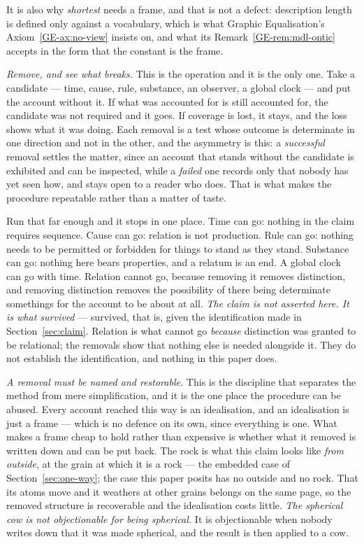 \documentclass[11pt,a4paper]{article}
\begin{document}
It is also why \emph{shortest} needs a frame, and that is not a defect: description length is defined
only against a vocabulary, which is what Graphic Equalisation's Axiom~\ref{GE-ax:no-view} insists on,
and what its Remark~\ref{GE-rem:mdl-ontic} accepts in the form that the constant is the frame.

\emph{Remove, and see what breaks.} This is the operation and it is the only one. Take a candidate ---
time, cause, rule, substance, an observer, a global clock --- and put the account without it. If what
was accounted for is still accounted for, the candidate was not required and it goes. If coverage is
lost, it stays, and the loss shows what it was doing. Each removal is a test whose outcome is determinate in one
direction and not in the other, and the asymmetry is this: a
\emph{successful} removal settles the matter, since an account that stands without the candidate is
exhibited and can be inspected, while a \emph{failed} one records only that nobody has yet seen how,
and stays open to a reader who does. That is what makes the procedure repeatable rather than a matter
of taste.

Run that far enough and it stops in one place. Time can go: nothing in the claim requires sequence.
Cause can go: relation is not production. Rule can go: nothing needs to be permitted or forbidden for
things to stand as they stand. Substance can go: nothing here bears properties, and a relatum is an
end. A global clock can go with time. Relation cannot go, because removing it removes distinction, and removing
distinction removes the possibility of there being determinate somethings for the account to be about at
all. \emph{The claim is not asserted here. It is what survived} --- survived, that is, given the
identification made in Section~\ref{sec:claim}. Relation is what cannot go \emph{because} distinction
was granted to be relational; the removals show that nothing else is needed alongside it. They do not
establish the identification, and nothing in this paper does.

\emph{A removal must be named and restorable.} This is the discipline that separates the method from
mere simplification, and it is the one place the procedure can be abused. Every account reached this way
is an idealisation, and an idealisation is just a frame --- which is no defence on its own, since
everything is one. What makes a frame cheap to hold rather than expensive is whether what it removed is
written down and can be put back. The rock is what this claim looks like \emph{from outside}, at the grain at which it is a
rock --- the embedded case of Section~\ref{sec:one-way}; the case this paper posits has no outside and
no rock. That its atoms move and it weathers at other grains belongs on the same page, so the removed
structure is recoverable and the idealisation costs little. \emph{The spherical cow is not objectionable
for being spherical.} It is objectionable when nobody writes down that it was made spherical, and the result is then applied
to a cow.
\end{document}
